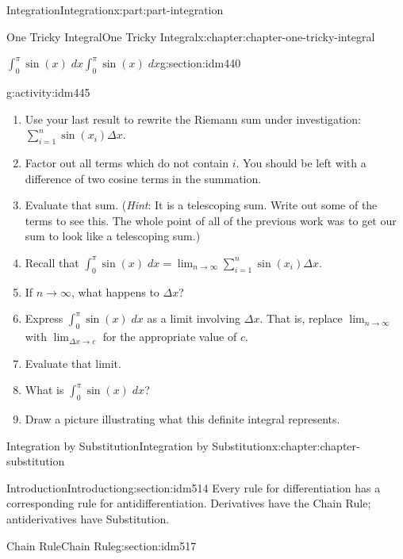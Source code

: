 \documentclass[oneside,10pt,]{book}
\numberwithin{equation}{section}
\begin{document}
\begin{partptx}{Integration}{}{Integration}{}{}{x:part:part-integration}
\begin{chapterptx}{One Tricky Integral}{}{One Tricky Integral}{}{}{x:chapter:chapter-one-tricky-integral}
\begin{sectionptx}{\(\displaystyle \int_0^\pi \sin(x) \; dx\)}{}{\(\displaystyle \int_0^\pi \sin(x) \; dx\)}{}{}{g:section:idm440}
\begin{activity}{}{g:activity:idm445}
\begin{enumerate}[font=\bfseries,label=(\alph*),ref=\alph*]
\item{}Use your last result to rewrite the Riemann sum under investigation: \(\displaystyle \sum_{i=1}^n \sin(x_i) \Delta x\).%
\item{}Factor out all terms which do not contain \(i\). You should be left with a difference of two cosine terms in the summation.%
\item{}Evaluate that sum. (\emph{Hint}: It is a telescoping sum. Write out some of the terms to see this. The whole point of all of the previous work was to get our sum to look like a telescoping sum.)%
\item{}Recall that \(\displaystyle \int_0^\pi \sin(x) \;dx = \lim_{n \to \infty} \sum_{i=1}^n \sin(x_i) \Delta x\).%
\item{}If \(n \to \infty\), what happens to \(\Delta x\)?%
\item{}Express \(\displaystyle \int_0^\pi \sin(x) \; dx\) as a limit involving \(\Delta x\). That is, replace \(\displaystyle \lim_{n \to \infty}\) with \(\displaystyle \lim_{\Delta x \to c}\) for the appropriate value of \(c\).%
\item{}Evaluate that limit.%
\item{}What is \(\displaystyle \int_0^\pi \sin(x) \; dx\)?%
\item{}Draw a picture illustrating what this definite integral represents.%
\end{enumerate}
\end{activity}
\end{sectionptx}
\end{chapterptx}
%
\typeout{************************************************}
\typeout{************************************************}
%
\begin{chapterptx}{Integration by Substitution}{}{Integration by Substitution}{}{}{x:chapter:chapter-substitution}
%
%
\typeout{************************************************}
\typeout{************************************************}
%
\begin{sectionptx}{Introduction}{}{Introduction}{}{}{g:section:idm514}
Every rule for differentiation has a corresponding rule for antidifferentiation. Derivatives have the Chain Rule; antiderivatives have Substitution.%
\end{sectionptx}
%
%
\typeout{************************************************}
\typeout{************************************************}
%
\begin{sectionptx}{Chain Rule}{}{Chain Rule}{}{}{g:section:idm517}

\end{sectionptx}
\end{chapterptx}
\end{partptx}
\end{document}
